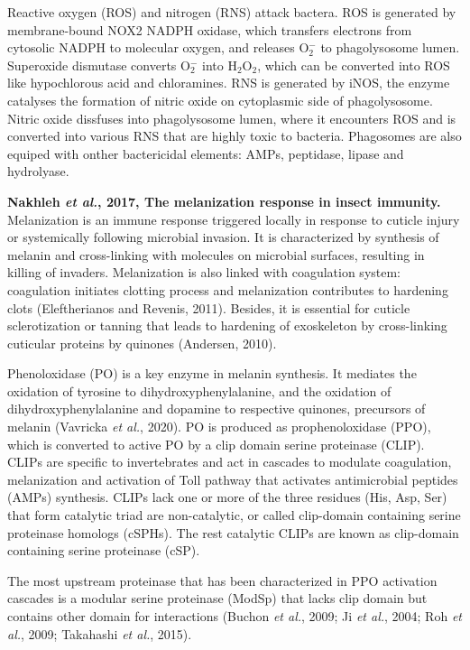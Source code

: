 \documentclass[11pt]{article}
\begin{document}
\begin{sloppypar}
Reactive oxygen (ROS) and nitrogen (RNS) attack bactera. 
ROS is generated by membrane-bound NOX2 NADPH oxidase, which transfers electrons from cytosolic NADPH to molecular oxygen, and releases O$_2^{-}$ to phagolysosome lumen. 
Superoxide dismutase converts O$_2^{-}$ into H$_2$O$_2$, which can be converted into ROS like hypochlorous acid and chloramines. 
RNS is generated by iNOS, the enzyme catalyses the formation of nitric oxide on cytoplasmic side of phagolysosome. 
Nitric oxide dissfuses into phagolysosome lumen, where it encounters ROS and is converted into various RNS that are highly toxic to bacteria. 
Phagosomes are also equiped with onther bactericidal elements: AMPs, peptidase, lipase and hydrolyase.
\par \newline \newline
\textbf{Nakhleh \textit{et al.}, 2017, The melanization response in insect immunity.}
Melanization is an immune response triggered locally in response to cuticle injury or systemically following microbial invasion. 
It is characterized by synthesis of melanin and cross-linking with molecules on microbial surfaces, resulting in killing of invaders. 
Melanization is also linked with coagulation system: coagulation initiates clotting process and melanization contributes to hardening clots (Eleftherianos and Revenis, 2011). 
Besides, it is essential for cuticle sclerotization or tanning that leads to hardening of exoskeleton by cross-linking cuticular proteins by quinones (Andersen, 2010). 
\par
Phenoloxidase (PO) is a key enzyme in melanin synthesis. 
It mediates the oxidation of tyrosine to dihydroxyphenylalanine, and the oxidation of dihydroxyphenylalanine and dopamine to respective quinones, precursors of melanin (Vavricka \textit{et al.}, 2020). 
PO is produced as prophenoloxidase (PPO), which is converted to active PO by a clip domain serine proteinase (CLIP). 
CLIPs are specific to invertebrates and act in cascades to modulate coagulation, melanization and activation of Toll pathway that activates antimicrobial peptides (AMPs) synthesis. 
CLIPs lack one or more of the three residues (His, Asp, Ser) that form catalytic triad are non-catalytic, or called clip-domain containing serine proteinase homologs (cSPHs). 
The rest catalytic CLIPs are known as clip-domain containing serine proteinase (cSP). 
\par
The most upstream proteinase that has been characterized in PPO activation cascades is a modular serine proteinase (ModSp) that lacks clip domain but contains other domain for interactions (Buchon \textit{et al.}, 2009; Ji \textit{et al.}, 2004; Roh \textit{et al.}, 2009; Takahashi \textit{et al.}, 2015). 

\end{sloppypar}
\end{document}
